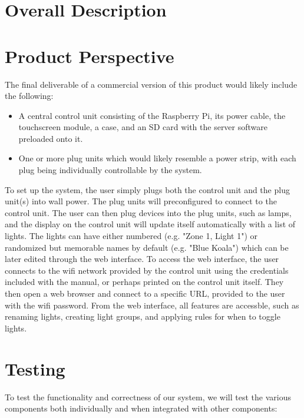 \documentclass[oneside,openright]{scrreprt}
\begin{document}
\section{Overall Description}

\section{Product Perspective}

The final deliverable of a commercial version of this product would likely include the following:

\begin{itemize}
    \item A central control unit consisting of the Raspberry Pi, its power
cable, the touchscreen module, a case, and an SD card with the server software
preloaded onto it.
    \item One or more plug units which would likely resemble a power strip,
with each plug being individually controllable by the system.
\end{itemize}

To set up the system, the user simply plugs both the control unit and the plug
unit(s) into wall power.  The plug units will preconfigured to connect to the
control unit.  The user can then plug devices into the plug units, such as
lamps, and the display on the control unit will update itself automatically
with a list of lights.  The lights can have either numbered (e.g. "Zone 1,
Light 1") or randomized but memorable names by default (e.g. "Blue Koala")
which can be later edited through the web interface.  To access the web
interface, the user connects to the wifi network provided by the control unit
using the credentials included with the manual, or perhaps printed on the
control unit itself.  They then open a web browser and connect to a specific
URL, provided to the user with the wifi password.  From the web interface, all
features are accessble, such as renaming lights, creating light groups, and
applying rules for when to toggle lights.

\section{Testing}

To test the functionality and correctness of our system, we will test the various components both individually and when integrated with other components:
\end{document}
